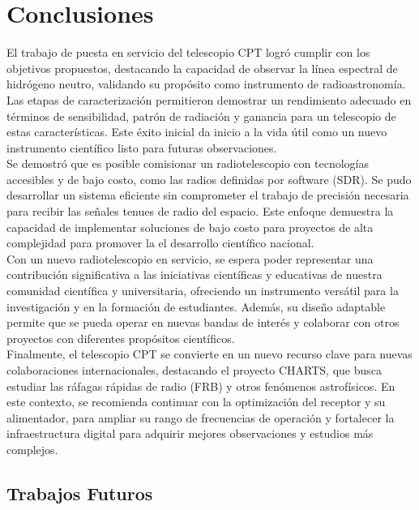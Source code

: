 \chapter{Conclusiones}

El trabajo de puesta en servicio del telescopio CPT logró cumplir con los objetivos propuestos, destacando la capacidad de observar la línea espectral de hidrógeno neutro, validando su propósito como instrumento de radioastronomía. Las etapas de caracterización permitieron demostrar un rendimiento adecuado en términos de sensibilidad, patrón de radiación y ganancia para un telescopio de estas características. Este éxito inicial da inicio a la vida útil como un nuevo instrumento científico listo para futuras observaciones.\\

Se demostró que es posible comisionar un radiotelescopio con tecnologías accesibles y de bajo costo, como las radios definidas por software (SDR). Se pudo desarrollar un sistema eficiente sin comprometer el trabajo de precisión necesaria para recibir las señales tenues de radio del espacio. Este enfoque demuestra la capacidad de implementar soluciones de bajo costo para proyectos de alta complejidad para promover la el desarrollo científico nacional.\\

Con un nuevo radiotelescopio en servicio, se espera poder representar una contribución significativa a las iniciativas científicas y educativas de nuestra comunidad científica y universitaria, ofreciendo un instrumento versátil para la investigación y en la formación de estudiantes. Además, su diseño adaptable permite que se pueda operar en nuevas bandas de interés y colaborar con otros proyectos con diferentes propósitos científicos.\\

Finalmente, el telescopio CPT se convierte en un nuevo recurso clave para nuevas colaboraciones internacionales, destacando el proyecto CHARTS, que busca estudiar las ráfagas rápidas de radio (FRB) y otros fenómenos astrofísicos. En este contexto, se recomienda continuar con la optimización del receptor y su alimentador, para ampliar su rango de frecuencias de operación y fortalecer la infraestructura digital para adquirir mejores observaciones y estudios más complejos.\\

\section{Trabajos Futuros}

